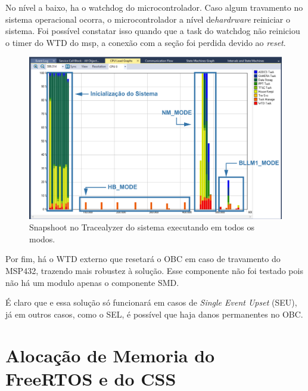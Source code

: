 No nível a baixo, ha o watchdog do microcontrolador. Caso algum travamento no sistema operacional ocorra, o microcontrolador a nível de\textit{hardrware} reiniciar o sistema. Foi possível constatar isso quando que a task do watchdog não reiniciou o timer do WTD do msp, a conexão com a seção foi perdida devido ao \textit{reset}.

\begin{figure}[h]
	\centering
	\caption{Snapshoot no Tracealyzer do sistema executando em todos os modos.}
	\includegraphics[keepaspectratio=true,scale=0.51]{figuras/trace_snapshoot_8.PNG}
	
	\label{trace_snapshoot_8}
\end{figure}


Por fim, há o WTD externo que resetará o OBC em caso de travamento do MSP432, trazendo mais robustez à solução. Esse componente não foi testado pois não há um modulo apenas o componente SMD.

É claro que e essa solução só funcionará em casos de \textit{Single Event Upset} (SEU), já em outros casos, como o SEL, é possível que haja danos permanentes no OBC. 

\newpage
\section{Alocação de Memoria do FreeRTOS e do CSS}

